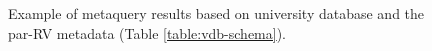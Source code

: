 \documentclass{IEEEtran}
\begin{document}
\begin{figure}[htb]
\begin{center}
\caption{Example of metaquery results based on university database and the par-RV metadata (Table \ref{table:vdb-schema}).
~\label{fig:meta-query}}
\end{center}
\end{figure}
%
%
\end{document}
